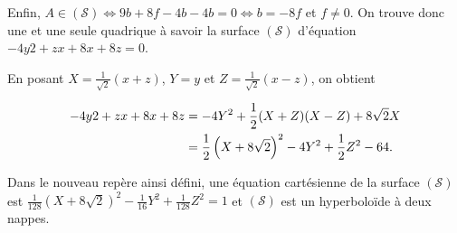 {{Enfin, $A\in(\mathcal{S})\Leftrightarrow 9b+8f-4b-4b = 0\Leftrightarrow b = -8f$ et $f\neq0$. On trouve donc une et une seule quadrique à savoir la surface $(\mathcal{S})$ d'équation $-4y2+zx+8x+8z=0$.

En posant $X=\frac{1}{\sqrt{2}}(x+z)$, $Y=y$ et $Z=\frac{1}{\sqrt{2}}(x-z)$, on obtient

\begin{align*}\ensuremath
-4y2+zx+8x+8z&=-4Y^2+\frac{1}{2}(X+Z)(X-Z)+8\sqrt{2}X\\
 &=\frac{1}{2}\left(X+8\sqrt{2}\right)^2-4Y^2+\frac{1}{2}Z^2 - 64.
\end{align*}

Dans le nouveau repère ainsi défini, une équation cartésienne de la surface $(\mathcal{S})$ est $\frac{1}{128}\left(X+8\sqrt{2}\right)^2-\frac{1}{16}Y^2+\frac{1}{128}Z^2=1$ et $(\mathcal{S})$ est  un hyperboloïde à deux nappes.}
}